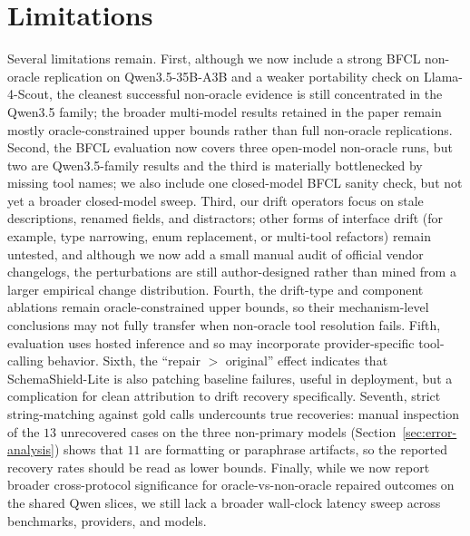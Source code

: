 \documentclass[runningheads]{llncs}
\newcommand{\method}{SchemaShield-Lite\xspace}
\begin{document}
\section{Limitations}
\label{sec:limitations}
Several limitations remain. First, although we now include a strong BFCL
non-oracle replication on Qwen3.5-35B-A3B and a weaker portability check on
Llama-4-Scout, the cleanest successful non-oracle evidence is still concentrated
in the Qwen3.5 family; the broader multi-model results retained in the paper
remain mostly oracle-constrained upper bounds rather than full non-oracle
replications. Second, the BFCL evaluation now covers three open-model non-oracle
runs, but two are Qwen3.5-family results and the third is materially bottlenecked
by missing tool names; we also include one closed-model BFCL sanity check, but
not yet a broader closed-model sweep. Third, our drift operators focus on stale
descriptions, renamed fields, and distractors; other forms of interface drift
(for example, type narrowing, enum replacement, or multi-tool refactors) remain
untested, and although we now add a small manual audit of official vendor
changelogs, the perturbations are still author-designed rather than mined from a
larger empirical change distribution. Fourth, the drift-type and component ablations remain
oracle-constrained upper bounds, so their mechanism-level conclusions may not fully
transfer when non-oracle tool resolution fails. Fifth, evaluation uses hosted
inference and so may incorporate provider-specific tool-calling behavior. Sixth, the ``repair $>$ original''
effect indicates that \method is also patching baseline failures, useful in
deployment, but a complication for clean attribution to drift recovery
specifically. Seventh, strict string-matching against gold calls undercounts true
recoveries: manual inspection of the $13$ unrecovered cases on the three
non-primary models (Section~\ref{sec:error-analysis}) shows that $11$ are
formatting or paraphrase artifacts, so the reported recovery rates should be
read as lower bounds. Finally, while we now report broader cross-protocol
significance for oracle-vs-non-oracle repaired outcomes on the shared Qwen slices,
we still lack a broader wall-clock latency sweep across benchmarks, providers, and
models.
\end{document}
